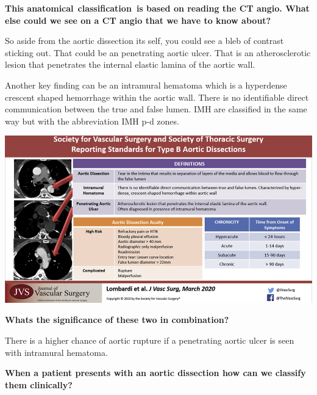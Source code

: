 \documentclass[
]{book}
\begin{document}
\textbf{This anatomical}~\textbf{classification~is based on reading the CT angio.
What else could we see on a CT angio that we have to know about?}

So aside from the aortic dissection its self, you could see a bleb of
contrast sticking out. That could be an penetrating aortic ulcer. That
is an atherosclerotic lesion that penetrates the internal elastic lamina
of the aortic wall.

Another key finding can be an intramural hematoma which is a hyperdense
crescent shaped hemorrhage within the aortic wall. There is no
identifiable direct communication between the true and false lumen. IMH
are classified in the same way but with the abbreviation IMH p-d zones.

\includegraphics[width=13.06in]{images/thoracic_dissection2}

\textbf{Whats the significance of these two in combination?}

There is a higher chance of aortic rupture if a penetrating aortic ulcer
is seen with intramural hematoma.

\textbf{When a patient presents with an aortic dissection how can we classify
them clinically?}
\end{document}
